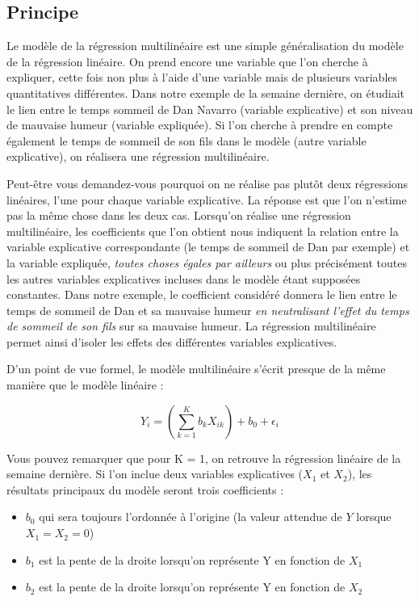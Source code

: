 \documentclass[
  french,
]{book}
\providecommand{\tightlist}{%
  \setlength{\itemsep}{0pt}\setlength{\parskip}{0pt}}
\begin{document}
\hypertarget{principe}{%
\subsection{Principe}\label{principe}}

Le modèle de la régression multilinéaire est une simple généralisation du modèle de la régression linéaire. On prend encore une variable que l'on cherche à expliquer, cette fois non plus à l'aide d'une variable mais de plusieurs variables quantitatives différentes. Dans notre exemple de la semaine dernière, on étudiait le lien entre le temps sommeil de Dan Navarro (variable explicative) et son niveau de mauvaise humeur (variable expliquée). Si l'on cherche à prendre en compte également le temps de sommeil de son fils dans le modèle (autre variable explicative), on réalisera une régression multilinéaire.

Peut-être vous demandez-vous pourquoi on ne réalise pas plutôt deux régressions linéaires, l'une pour chaque variable explicative. La réponse est que l'on n'estime pas la même chose dans les deux cas. Lorsqu'on réalise une régression multilinéaire, les coefficients que l'on obtient nous indiquent la relation entre la variable explicative correspondante (le temps de sommeil de Dan par exemple) et la variable expliquée, \emph{toutes choses égales par ailleurs} ou plus précisément toutes les autres variables explicatives incluses dans le modèle étant supposées constantes. Dans notre exemple, le coefficient considéré donnera le lien entre le temps de sommeil de Dan et sa mauvaise humeur \emph{en neutralisant l'effet du temps de sommeil de son fils} sur sa mauvaise humeur. La régression multilinéaire permet ainsi d'isoler les effets des différentes variables explicatives.

D'un point de vue formel, le modèle multilinéaire s'écrit presque de la même manière que le modèle linéaire :

\[ Y_i = (\sum_{k = 1}^{K} b_k X_{ik}) + b_0 + \epsilon_i \]

Vous pouvez remarquer que pour K = 1, on retrouve la régression linéaire de la semaine dernière. Si l'on inclue deux variables explicatives (\(X_1\) et \(X_2\)), les résultats principaux du modèle seront trois coefficients :

\begin{itemize}
\tightlist
\item
  \(b_0\) qui sera toujours l'ordonnée à l'origine (la valeur attendue de \(Y\) lorsque \(X_1 = X_2 = 0\))
\item
  \(b_1\) est la pente de la droite lorsqu'on représente Y en fonction de \(X_1\)
\item
  \(b_2\) est la pente de la droite lorsqu'on représente Y en fonction de \(X_2\)
\end{itemize}
\end{document}
